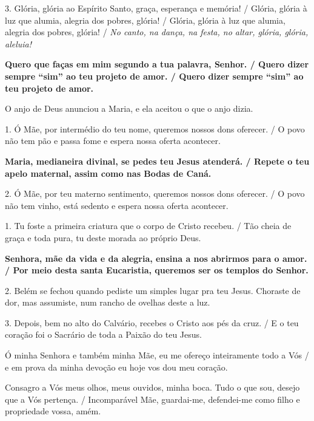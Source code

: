 \documentclass[a5paper,9pt]{extarticle}
\begin{document}
\begin{cantos}
\begin{canto}
3. Glória, glória ao Espírito Santo, graça, esperança e memória! / Glória, glória à luz que alumia, alegria dos pobres, glória! / Glória, glória à luz que alumia, alegria dos pobres, glória! / \emph{No canto, na dança, na festa, no altar, glória, glória, aleluia! }
\end{canto}

\begin{canto}
\textbf{Quero que faças em mim segundo a tua palavra, Senhor. / Quero dizer sempre ``sim'' ao teu projeto de amor. / Quero dizer sempre ``sim'' ao teu projeto de amor.}

O anjo de Deus anunciou a Maria, e ela aceitou o que o anjo dizia.
\end{canto}

\begin{canto}
1. Ó Mãe, por intermédio do teu nome, queremos nossos dons oferecer. / O povo não tem pão e passa fome e espera nossa oferta acontecer.

\textbf{Maria, medianeira divinal, se pedes teu Jesus atenderá. / Repete o teu apelo maternal, assim como nas Bodas de Caná.}

2. Ó Mãe, por teu materno sentimento, queremos nossos dons oferecer. / O povo não tem vinho, está sedento e espera nossa oferta acontecer.
\end{canto}

\begin{canto}
1. Tu foste a primeira criatura que o corpo de Cristo recebeu. / Tão cheia de graça e toda pura, tu deste morada ao próprio Deus.

\textbf{Senhora, mãe da vida e da alegria, ensina a nos abrirmos para o amor. / Por meio desta santa Eucaristia, queremos ser os templos do Senhor.}

2. Belém se fechou quando pediste um simples lugar pra teu Jesus. Choraste de dor, mas assumiste, num rancho de ovelhas deste a luz.

3. Depois, bem no alto do Calvário, recebes o Cristo aos pés da cruz. / E o teu coração foi o Sacrário de toda a Paixão do teu Jesus.
\end{canto}

\begin{canto}
Ó minha Senhora e também minha Mãe, eu me ofereço inteiramente todo a Vós / e em prova da minha devoção eu hoje vos dou meu coração.

Consagro a Vós meus olhos, meus ouvidos, minha boca. Tudo o que sou, desejo que a Vós pertença. / Incomparável Mãe, guardai-me, defendei-me como filho e propriedade vossa, amém.
\end{canto}


\end{cantos}
\end{document}
